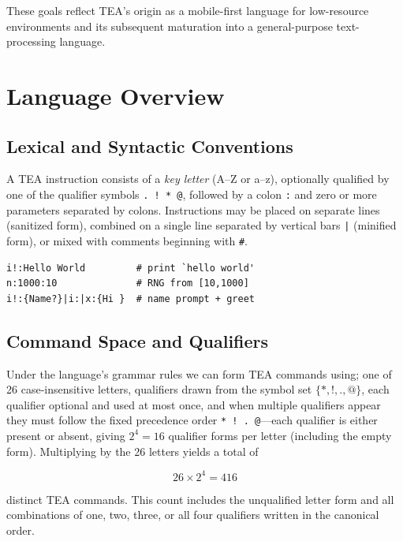 \documentclass[sigplan,screen]{acmart}
\begin{document}
These goals reflect TEA's origin as a mobile-first language for low-resource environments and its subsequent maturation into a general-purpose text-processing language.

\section{Language Overview}
\label{SEC3}

\subsection{Lexical and Syntactic Conventions}
A TEA instruction consists of a \emph{key letter} (A–Z or a–z), optionally qualified by one of the qualifier symbols \texttt{. ! * @}, followed by a colon \texttt{:} and zero or more parameters separated by colons. Instructions may be placed on separate lines (sanitized form), combined on a single line separated by vertical bars \texttt{|} (minified form), or mixed with comments beginning with \texttt{\#}.

\begin{lstlisting}[style=tea,caption=Minimal TEA Program Examples,label=LST1] 
i!:Hello World         # print `hello world'
n:1000:10              # RNG from [10,1000]
i!:{Name?}|i:|x:{Hi }  # name prompt + greet
\end{lstlisting}

\subsection{Command Space and Qualifiers}

\noindent Under the language's grammar rules \cite{Lutalo2024TEATAZ} we can form TEA commands using; one of 26 case‑insensitive letters, qualifiers drawn from the symbol set
$\{*,!,.,@\}$, each qualifier optional and used at most once, and when multiple qualifiers appear they must follow the fixed precedence order \texttt{* ! . @}---each qualifier is either present or absent, giving $2^{4}=16$ qualifier forms per letter (including the empty form). Multiplying by the 26 letters yields a total of


\[
26 \times 2^{4} = 416
\]


distinct TEA commands. This count includes the unqualified letter form and all combinations of one, two, three, or all four qualifiers written in the canonical order.
\end{document}
